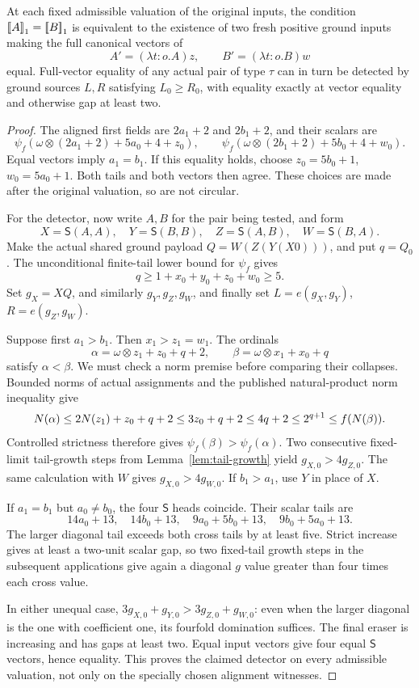 \begin{lemma}\label{lem:functional-detector}
At each fixed admissible valuation of the original inputs, the condition
$\mathopen{[\![}A\mathclose{]\!]}_1=\mathopen{[\![}B\mathclose{]\!]}_1$ is equivalent to the existence of two fresh
positive ground inputs making the full canonical vectors of
\[
 A'=(\lambda t:o.A)z,\qquad B'=(\lambda t:o.B)w
\]
equal.  Full-vector equality of any actual pair of type $\tau$ can in turn
be detected by ground sources $L,R$ satisfying $L_0\ge R_0$, with equality
exactly at vector equality and otherwise gap at least two.
\end{lemma}
\begin{proof}
The aligned first fields are $2a_1+2$ and $2b_1+2$, and their scalars are
\[
 \psi_f(\omega\otimes(2a_1+2)+5a_0+4+z_0),\qquad
 \psi_f(\omega\otimes(2b_1+2)+5b_0+4+w_0).
\]
Equal vectors imply $a_1=b_1$.  If this equality holds, choose
$z_0=5b_0+1$, $w_0=5a_0+1$.  Both tails and both vectors then agree.
These choices are made after the original valuation, so are not circular.

For the detector, now write $A,B$ for the pair being tested, and form
\[
 X=\mathsf S(A,A),\quad Y=\mathsf S(B,B),\quad
 Z=\mathsf S(A,B),\quad W=\mathsf S(B,A).
\]
Make the actual shared ground payload
$Q=W(Z(Y(X0)))$, and put $q=Q_0$.
The unconditional finite-tail lower bound for $\psi_f$ gives
\[
 q\ge1+x_0+y_0+z_0+w_0\ge5.
\]
Set $g_X=XQ$, and similarly $g_Y,g_Z,g_W$, and finally set
$L=e(g_X,g_Y)$, $R=e(g_Z,g_W)$.

Suppose first $a_1>b_1$.  Then $x_1>z_1=w_1$.  The ordinals
\[
 \alpha=\omega\otimes z_1+z_0+q+2,
 \qquad \beta=\omega\otimes x_1+x_0+q
\]
satisfy $\alpha<\beta$.  We must check a norm premise before comparing
their collapses.  Bounded norms of actual assignments and the published
natural-product norm inequality \cite[Propositions 2.2--2.3]{ww} give
\[
 N(\alpha)\le2N(z_1)+z_0+q+2
 \le3z_0+q+2\le4q+2
 \le2^{q+1}\le f(N(\beta)).
\]
Controlled strictness therefore gives $\psi_f(\beta)>\psi_f(\alpha)$.
Two consecutive fixed-limit tail-growth steps from Lemma~\ref{lem:tail-growth}
yield $g_{X,0}>4g_{Z,0}$.  The same calculation with $W$ gives
$g_{X,0}>4g_{W,0}$.  If $b_1>a_1$, use $Y$ in place of $X$.

If $a_1=b_1$ but $a_0\ne b_0$, the four $\mathsf S$ heads coincide.
Their scalar tails are
\[
 14a_0+13,\quad14b_0+13,\quad
 9a_0+5b_0+13,\quad9b_0+5a_0+13.
\]
The larger diagonal tail exceeds both cross tails by at least five.
Strict increase gives at least a two-unit scalar gap, so two fixed-tail
growth steps in the subsequent applications give again a diagonal $g$
value greater than four times each cross value.

In either unequal case,
$3g_{X,0}+g_{Y,0}>3g_{Z,0}+g_{W,0}$: even when the larger diagonal
is the one with coefficient one, its fourfold domination suffices.
The final eraser is increasing and has gaps at least two.
Equal input vectors give four equal $\mathsf S$ vectors, hence equality.
This proves the claimed detector on every admissible valuation, not only
on the specially chosen alignment witnesses.
\end{proof}

